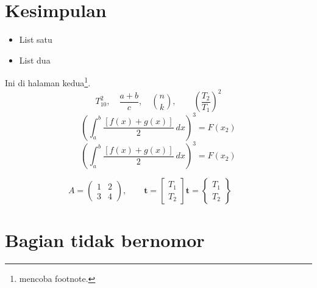 
\section{Kesimpulan}
    \begin{itemize}
        \item List satu
        \item List dua 
    \end{itemize}
    
    Ini di halaman kedua\footnote{mencoba footnote.}.
    \[
        T_{10}^2,\quad \frac{a+b}{c},\quad \binom{n}{k},
        \qquad \left(\frac{T_2}{T_1}\right)^2
    \]
    \[
        ( \int_a^b \frac{\left[f(x)+g(x)\right]}{2}\ dx )^3 = F(x_{2})
    \]
    \[
        \left( \int_a^b \frac{\left[f(x)+g(x)\right]}{2}\ dx \right)^3 = F(x_{2})
    \]

    \[
        A = \begin{pmatrix} 1 & 2 \\ 3 & 4 \end{pmatrix},
        \qquad
        \mathbf{t} = \begin{bmatrix} T_1 \\ T_2 \end{bmatrix} 
        \mathbf{t} = \begin{Bmatrix} T_1 \\ T_2 \end{Bmatrix} 
        \qquad 
    \]

\section{Bagian tidak bernomor}
\lipsum[5]
